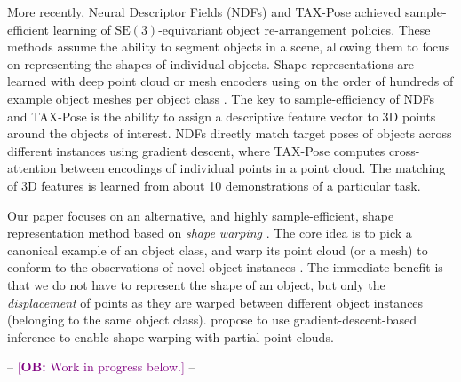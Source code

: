 \documentclass{article}
\newcommand{\ob}[1]{\textcolor{purple}{[\textbf{OB:} #1]}}
\begin{document}
More recently, Neural Descriptor Fields (NDFs) \cite{simeonov22Neurala,simeonov22SE} and TAX-Pose \cite{pan22TAXPose} achieved sample-efficient learning of $\mathrm{SE}(3)$-equivariant object re-arrangement policies. These methods assume the ability to segment objects in a scene, allowing them to focus on representing the shapes of individual objects. Shape representations are learned with deep point cloud \cite{qi17PointNet,qi17PointNeta} or mesh \cite{mescheder19Occupancy,park19DeepSDF} encoders using on the order of hundreds of example object meshes per object class \cite{chang15ShapeNet}. The key to sample-efficiency of NDFs and TAX-Pose is the ability to assign a descriptive feature vector to 3D points around the objects of interest. NDFs directly match target poses of objects across different instances using gradient descent, where TAX-Pose computes cross-attention between encodings of individual points in a point cloud. The matching of 3D features is learned from about 10 demonstrations of a particular task.

Our paper focuses on an alternative, and highly sample-efficient, shape representation method based on \textit{shape warping} \citep{jakel12Learning,brandi14Generalizing,lee15Learning,schulman16Learning,rodriguez18Transferringa,rodriguez18Transferringb,thompson21ShapeBased}. The core idea is to pick a canonical example of an object class, and warp its point cloud (or a mesh) to conform to the observations of novel object instances \cite{myronenko10PointSeta,hillenbrand12Transferring,benamor12Generalizationa}. The immediate benefit is that we do not have to represent the shape of an object, but only the \textit{displacement} of points as they are warped between different object instances (belonging to the same object class). \citet{thompson21shape} propose to use gradient-descent-based inference to enable shape warping with partial point clouds.

-- \ob{Work in progress below.} --
\end{document}
